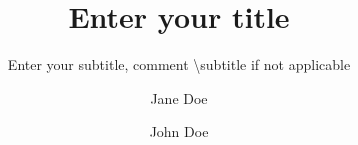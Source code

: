 \documentclass{def/tuberlin}
\author{Jane Doe 
	\and John Doe 
}
\title{Enter your title}
\subtitle{Enter your subtitle, comment \textbackslash subtitle if not applicable}
\begin{document}
    
\tuberlintitle
\end{document}

